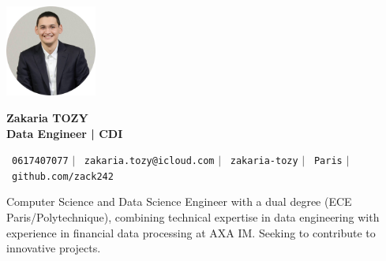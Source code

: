 \documentclass[11pt,a4paper]{article}
\begin{document}
\begin{flushleft}
  \begin{minipage}[c]{0.2\textwidth}
    \includegraphics[width=3cm]{images/profilpicture.png}
  \end{minipage}%
  \begin{minipage}[c]{0.8\textwidth}
    {\Huge \textbf{Zakaria TOZY}} \\[5pt]
    {\Large \textbf{Data Engineer | CDI}}
  \end{minipage}
\end{flushleft}

\vspace{-5pt}

\begin{center}
    \small \faPhone\ \texttt{0617407077} \hspace{1pt} $|$
    \hspace{1pt} \faEnvelope\ \texttt{zakaria.tozy@icloud.com} \hspace{1pt} $|$
    \hspace{1pt} \faLinkedin\ \texttt{zakaria-tozy} \hspace{1pt} $|$
    \hspace{1pt} \faMapMarker\ \texttt{Paris} \hspace{1pt} $|$
    \hspace{1pt} \faGithub\ \texttt{github.com/zack242} \\ \vspace{0pt}
\end{center}

\begin{itemize}[leftmargin=0in, label={}]
\footnotesize{\item{
Computer Science and Data Science Engineer with a dual degree (ECE Paris/Polytechnique), combining technical expertise in data engineering with experience in financial data processing at AXA IM. Seeking to contribute to innovative projects.
}}
\end{itemize}
\end{document}
